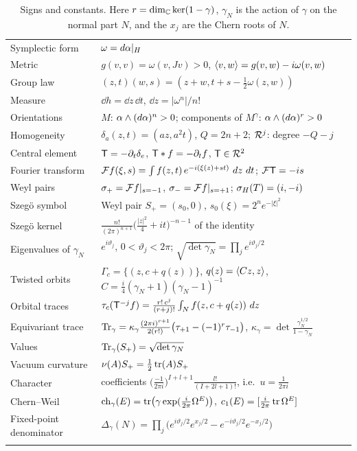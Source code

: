 \documentclass[11pt]{amsart}
\theoremstyle{plain}
\theoremstyle{definition}
\theoremstyle{remark}
\begin{document}
\begin{table}[ht]
\centering
\small
\renewcommand{\arraystretch}{1.7}
\begin{tabular}{@{}>{\raggedright}p{}>{\raggedright\arraybackslash}p{}@{}}
\toprule
Symplectic form & $\omega=d\alpha|_H$\\
Metric &  $g(v,v)=\omega(v,Jv)>0$, $\langle v,w \rangle=g(v,w)-i\omega(v,w)$ \\
Group law & $(z,t)(w,s)=(z+w,t+s-\frac12\omega(z,w))$\\
Measure & $\dd h=\dd z\,\dd t$, $\dd z=|\omega^n|/n!$ \\
Orientations & $M$: $\alpha\wedge(d\alpha)^n>0$; components of $M^\gamma$: $\alpha\wedge(d\alpha)^r>0$ \\
Homogeneity & $\delta_a(z,t)=(az,a^2t)$, $Q=2n+2$; $\mathcal{R}^j$: degree $-Q-j$ \\
Central element & $\mathsf{T}=-\partial_t\delta_e$, $\mathsf{T}*f=-\partial_tf$, $\mathsf{T}\in\mathcal{R}^2$ \\
Fourier transform & ${\mathcal{F}} f(\xi,s)=\int f(z,t)\,e^{-i(\xi(z)+s t)}\,\,d z\,\,d t$; ${\mathcal{F}}\mathsf{T}=-is$ \\
Weyl pairs & $\sigma_+={\mathcal{F}} f|_{s=-1}$, $\sigma_-={\mathcal{F}} f|_{s=+1}$; $\sigma_H(T)=(i,-i)$ \\
Szeg\"{o} symbol & Weyl pair  $S_+=(s_0,0)$, $s_0(\xi)=2^ne^{-|\xi|^2}$\\
Szeg\"{o} kernel & $\frac{n!}{(2\pi)^{n+1}}\bigl(\frac{|z|^2}{4}+it\bigr)^{-n-1}$ of the identity\\
Eigenvalues of $\gamma_N$ & $e^{i\vartheta_j}$, $0<\vartheta_j<2\pi$; $\sqrt{\det\gamma_N}=\prod_je^{i\vartheta_j/2}$ \\
Twisted orbits & $\Gamma_c=\{(z,c+q(z))\}$, $q(z)=\langle Cz,z \rangle$, $C=\frac i4(\gamma_N+1)(\gamma_N-1)^{-1}$ \\
Orbital traces & $\tau_{c}(\mathsf{T}^{-j}f)=\frac{r!\,c^j}{(r+j)!}\int_Nf(z,c+q(z))\,\,d z$ \\
Equivariant trace & $\operatorname{Tr}_\gamma=\kappa_\gamma\frac{(2\pi i)^{r+1}}{2(r!)}\bigl(\tau_{+1}-(-1)^r\tau_{-1}\bigr)$, $\kappa_\gamma=\det\frac{\gamma_N^{1/2}}{1-\gamma_N}$ \\
Values & $\operatorname{Tr}_\gamma(S_+)=\sqrt{\det\gamma_N}$\\
Vacuum curvature & $\nu(A)S_+=\frac12\operatorname{tr}(A)S_+$ \\
Character & coefficients $\bigl(\frac{-1}{2\pi i}\bigr)^{I+l+1}\frac{l!}{(I+2l+1)!}$, i.e.\ $u=\frac{1}{2\pi i}$ \\
Chern--Weil & $\operatorname{ch}_\gamma(E)=\operatorname{tr}\bigl(\gamma\exp(\frac{i}{2\pi}\Omega^E)\bigr)$, $c_1(E)=[\frac{i}{2\pi}\operatorname{tr}\Omega^E]$ \\
Fixed-point denominator & $\Delta_\gamma(N)=\prod_j\bigl(e^{i\vartheta_j/2}e^{x_j/2}-e^{-i\vartheta_j/2}e^{-x_j/2}\bigr)$ \\
\bottomrule
\vskip 6pt
\end{tabular}
\caption{Signs and constants. Here $r=\dim_{\mathbb{C}}\ker(1-\gamma)$, $\gamma_N$ is the action of $\gamma$ on the normal part $N$, and the $x_j$ are the Chern roots of $N$.}
\label{tab:conventions}
\end{table}
\end{document}
